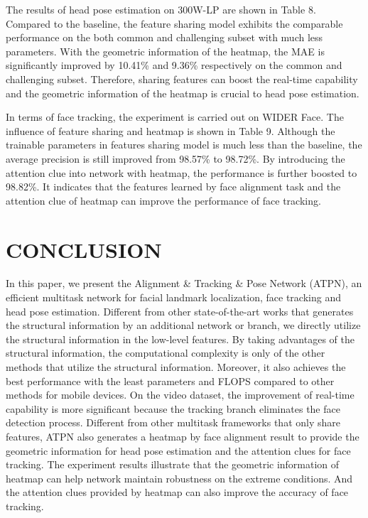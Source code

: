 \documentclass[3p,twocolumn, round, sort & compress]{elsarticle}
\begin{document}
The results of head pose estimation on 300W-LP are shown in Table 8. Compared to the baseline, the feature sharing model exhibits the comparable performance on the both common and challenging subset with much less parameters. With the geometric information of the heatmap, the MAE is significantly improved by 10.41\% and 9.36\% respectively on the common and challenging subset. Therefore, sharing features can boost the real-time capability and the geometric information of the heatmap is crucial to head pose estimation.

In terms of face tracking, the experiment is carried out on WIDER Face. The influence of feature sharing and heatmap is shown in Table 9. Although the trainable parameters in features sharing model is much less than the baseline, the average precision is still improved from 98.57\% to 98.72\%. By introducing the attention clue into network with heatmap, the performance is further boosted to 98.82\%. It indicates that the features learned by face alignment task and the attention clue of heatmap can improve the performance of face tracking.









\section{CONCLUSION}
In this paper, we present the Alignment \& Tracking \& Pose Network (ATPN), an efficient multitask network for facial landmark localization, face tracking and head pose estimation. Different from other state-of-the-art works that generates the structural information by an additional network or branch, we directly utilize the structural information in the low-level features. By taking advantages of the structural information, the computational complexity is only  of the other methods that utilize the structural information. Moreover, it also achieves the best performance with the least parameters and FLOPS compared to other methods for mobile devices. On the video dataset, the improvement of real-time capability is more significant because the tracking branch eliminates the face detection process. Different from other multitask frameworks that only share features, ATPN also generates a heatmap by face alignment result to provide the geometric information for head pose estimation and the attention clues for face tracking. The experiment results illustrate that the geometric information of heatmap can help network maintain robustness on the extreme conditions. And the attention clues provided by heatmap can also improve the accuracy of face tracking.
\end{document}
